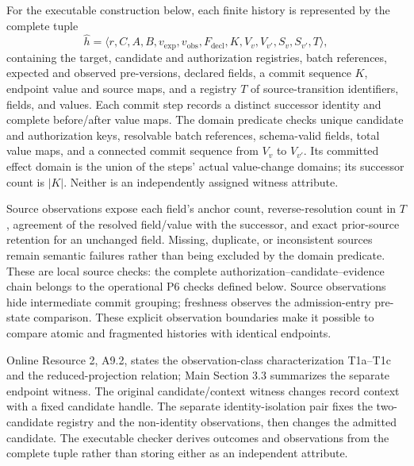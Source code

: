 \documentclass[11pt,a4paper]{article}
\begin{document}
For the executable construction below, each finite history is represented by the complete tuple
\begin{equation}
\widehat h=\langle r,C,A,B,v_{\mathrm{exp}},v_{\mathrm{obs}},
F_{\mathrm{decl}},K,V_v,V_{v'},S_v,S_{v'},T\rangle,
\label{eq:witness-history}
\end{equation}
containing the target, candidate and authorization registries, batch references, expected and observed pre-versions, declared fields, a commit sequence $K$, endpoint value and source maps, and a registry $T$ of source-transition identifiers, fields, and values. Each commit step records a distinct successor identity and complete before/after value maps. The domain predicate checks unique candidate and authorization keys, resolvable batch references, schema-valid fields, total value maps, and a connected commit sequence from $V_v$ to $V_{v'}$. Its committed effect domain is the union of the steps' actual value-change domains; its successor count is $|K|$. Neither is an independently assigned witness attribute.

Source observations expose each field's anchor count, reverse-resolution count in $T$, agreement of the resolved field/value with the successor, and exact prior-source retention for an unchanged field. Missing, duplicate, or inconsistent sources remain semantic failures rather than being excluded by the domain predicate. These are local source checks: the complete authorization--candidate--evidence chain belongs to the operational P6 checks defined below. Source observations hide intermediate commit grouping; freshness observes the admission-entry pre-state comparison. These explicit observation boundaries make it possible to compare atomic and fragmented histories with identical endpoints.

Online Resource 2, A9.2, states the observation-class characterization T1a--T1c and the reduced-projection relation; Main Section 3.3 summarizes the separate endpoint witness. The original candidate/context witness changes record context with a fixed candidate handle. The separate identity-isolation pair fixes the two-candidate registry and the non-identity observations, then changes the admitted candidate. The executable checker derives outcomes and observations from the complete tuple rather than storing either as an independent attribute.
\end{document}
